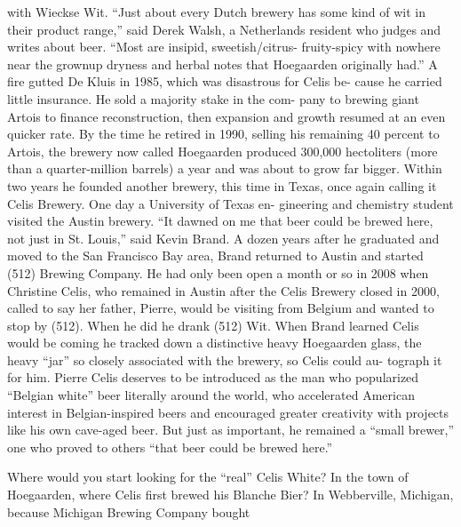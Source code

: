 \documentclass[a4paper,parskip=half]{scrartcl}
\begin{document}
\parencite[49]{Hieronymus2010}

with Wieckse Wit. “Just about every Dutch brewery has some kind of
wit in their product range,” said Derek Walsh, a Netherlands resident
who judges and writes about beer. “Most are insipid, sweetish/citrus-
fruity-spicy with nowhere near the grownup dryness and herbal notes
that Hoegaarden originally had.”
A fire gutted De Kluis in 1985, which was disastrous for Celis be-
cause he carried little insurance. He sold a majority stake in the com-
pany to brewing giant Artois to finance reconstruction, then expansion
and growth resumed at an even quicker rate. By the time he retired in
1990, selling his remaining 40 percent to Artois, the brewery now called
Hoegaarden produced 300,000 hectoliters (more than a quarter-million
barrels) a year and was about to grow far bigger.
Within two years he founded another brewery, this time in Texas,
once again calling it Celis Brewery. One day a University of Texas en-
gineering and chemistry student visited the Austin brewery. “It dawned
on me that beer could be brewed here, not just in St. Louis,” said Kevin
Brand. A dozen years after he graduated and moved to the San Francisco
Bay area, Brand returned to Austin and started (512) Brewing Company.
He had only been open a month or so in 2008 when Christine Celis,
who remained in Austin after the Celis Brewery closed in 2000, called
to say her father, Pierre, would be visiting from Belgium and wanted to
stop by (512).
When he did he drank (512) Wit. When Brand learned Celis would
be coming he tracked down a distinctive heavy Hoegaarden glass, the
heavy “jar” so closely associated with the brewery, so Celis could au-
tograph it for him. Pierre Celis deserves to be introduced as the man
who popularized “Belgian white” beer literally around the world, who
accelerated American interest in Belgian-inspired beers and encouraged
greater creativity with projects like his own cave-aged beer. But just as
important, he remained a “small brewer,” one who proved to others
“that beer could be brewed here.”

Where would you start looking for the “real” Celis White? In the
town of Hoegaarden, where Celis first brewed his Blanche Bier? In
Webberville, Michigan, because Michigan Brewing Company bought

\parencite[50]{Hieronymus2010}
\end{document}
